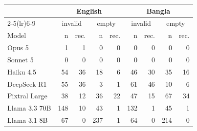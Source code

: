 \begin{tabular}{l rr rr rr rr}
\toprule
& \multicolumn{4}{c}{English} & \multicolumn{4}{c}{Bangla} \\
\cmidrule(lr){2-5}\cmidrule(lr){6-9}
& \multicolumn{2}{c}{invalid} & \multicolumn{2}{c}{empty} & \multicolumn{2}{c}{invalid} & \multicolumn{2}{c}{empty} \\
Model & n & rec. & n & rec. & n & rec. & n & rec. \\
\midrule
Opus 5 & 1 & 1 & 0 & 0 & 0 & 0 & 0 & 0 \\
Sonnet 5 & 0 & 0 & 0 & 0 & 0 & 0 & 0 & 0 \\
Haiku 4.5 & 54 & 36 & 18 & 6 & 46 & 30 & 35 & 16 \\
DeepSeek-R1 & 55 & 36 & 3 & 1 & 61 & 46 & 10 & 6 \\
Pixtral Large & 38 & 12 & 36 & 22 & 47 & 15 & 67 & 34 \\
Llama 3.3 70B & 148 & 10 & 43 & 1 & 132 & 1 & 45 & 1 \\
Llama 3.1 8B & 67 & 0 & 237 & 1 & 64 & 0 & 214 & 0 \\
\bottomrule
\end{tabular}
